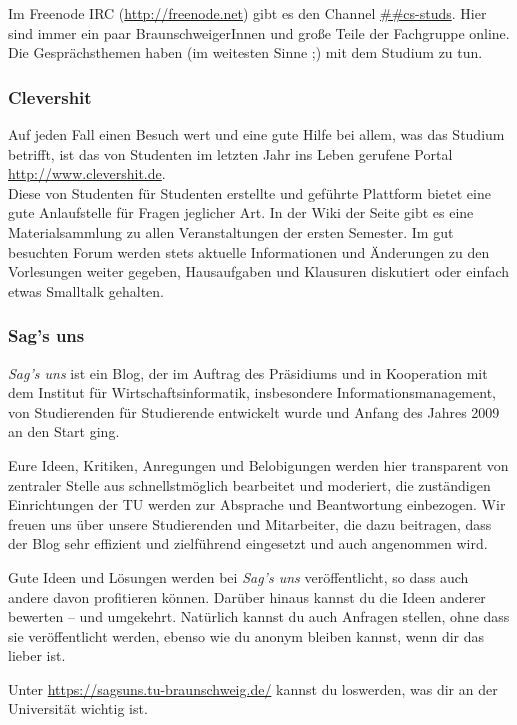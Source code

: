 Im Freenode IRC (\url{http://freenode.net}) gibt es den Channel \url{##cs-studs}. Hier sind immer ein paar BraunschweigerInnen und große Teile der Fachgruppe online. Die Gesprächsthemen haben (im weitesten Sinne ;) mit dem Studium zu tun.

\subsubsection*{Clevershit}

Auf jeden Fall einen Besuch wert und eine gute Hilfe bei allem, was das Studium betrifft, ist das von Studenten im letzten Jahr ins Leben gerufene Portal \mbox{\url{http://www.clevershit.de}}.\\
Diese von Studenten für Studenten erstellte und geführte Plattform bietet eine gute Anlaufstelle für Fragen jeglicher Art. In der Wiki der Seite gibt es eine Materialsammlung zu allen Veranstaltungen der ersten Semester. Im gut besuchten Forum werden stets aktuelle Informationen und Änderungen zu den Vorlesungen weiter gegeben, Hausaufgaben und Klausuren diskutiert oder einfach etwas Smalltalk gehalten.

\subsubsection*{Sag's uns}
\emph{Sag's uns} ist ein Blog, der im Auftrag des Präsidiums und in Kooperation mit dem Institut für Wirtschaftsinformatik, insbesondere Informationsmanagement, von Studierenden für Studierende entwickelt wurde und Anfang des Jahres 2009 an den Start ging.

Eure Ideen, Kritiken, Anregungen und Belobigungen werden hier transparent von zentraler Stelle aus schnellstmöglich bearbeitet und moderiert, die zuständigen Einrichtungen der TU werden zur Absprache und Beantwortung einbezogen. 
Wir freuen uns über unsere Studierenden und Mitarbeiter, die dazu beitragen, dass der Blog sehr effizient und zielführend eingesetzt und auch angenommen wird.

Gute Ideen und Lösungen werden bei \emph{Sag's uns} veröffentlicht, so dass auch andere davon profitieren können.
Darüber hinaus kannst du die Ideen anderer bewerten – und umgekehrt. Natürlich kannst du auch Anfragen stellen, ohne dass sie veröffentlicht werden, ebenso wie du anonym bleiben kannst, wenn dir das lieber ist.

Unter \url{https://sagsuns.tu-braunschweig.de/} kannst du loswerden, was dir an der Universität wichtig ist.


